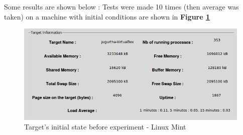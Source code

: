 \begin{center}
\end{center}


Some results are shown below :
Tests were made 10 times (then average was taken) on a machine with initial conditions are shown in \textbf{Figure \ref{Target's initial state before experiment - Linux Mint}}

     		\begin{figure}[H]
					\centering
        			\includegraphics[scale=0.45]{img/solution/cmptracers-target-information.png}
        			\caption{Target's initial state before experiment - Linux Mint}
        			\label{Target's initial state before experiment - Linux Mint}
   			 \end{figure}
   			 

